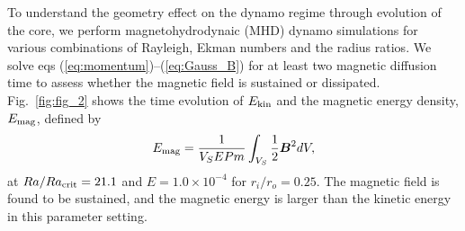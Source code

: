 {\color{red}
To understand the geometry effect on the dynamo regime through evolution of the core, we perform magnetohydrodynaic (MHD) dynamo simulations for various combinations of Rayleigh, Ekman numbers and the radius ratios.
We solve eqs (\ref{eq:momentum})--(\ref{eq:Gauss_B}) for at least two magnetic diffusion time to assess whether the magnetic field is sustained or dissipated.
}
{\color{red}
Fig.~\ref{fig:fig_2} shows the time evolution of $E_{\rm kin}$ and the magnetic energy density, $E_{\rm mag}$, defined by
%
\begin{equation}
E_{\rm mag} = \frac{1}{V_{S}E Pm} \int_{V_{S}} \frac{1}{2} \mbox{\boldmath$B$}^{2} dV,
\label{eq:magnetic_energy}
\end{equation}
%
at $Ra/Ra_{\rm crit} = 21.1$ and $E = 1.0 \times 10^{-4}$ for $r_i/r_o = 0.25$.
}
%
% 
%
{\color{red}
The magnetic field is found to be sustained, and the magnetic energy is larger than the kinetic energy in this parameter setting.
}

